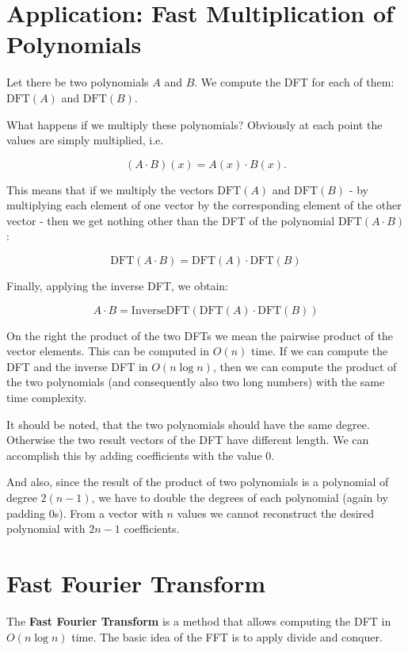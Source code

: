 \documentclass[12pt]{article}
\theoremstyle{definition}
\begin{document}
\section{Application: Fast Multiplication of Polynomials}

Let there be two polynomials $A$ and $B$.
We compute the DFT for each of them: $\text{DFT}(A)$ and $\text{DFT}(B)$.

What happens if we multiply these polynomials? Obviously at each point the values are simply multiplied, i.e.

$$(A \cdot B)(x) = A(x) \cdot B(x).$$

This means that if we multiply the vectors $\text{DFT}(A)$ and $\text{DFT}(B)$ - by multiplying each element of one vector by the corresponding element of the other vector - then we get nothing other than the DFT of the polynomial $\text{DFT}(A \cdot B)$:

$$\text{DFT}(A \cdot B) = \text{DFT}(A) \cdot \text{DFT}(B)$$

Finally, applying the inverse DFT, we obtain:

$$A \cdot B = \text{InverseDFT}(\text{DFT}(A) \cdot \text{DFT}(B))$$

On the right the product of the two DFTs we mean the pairwise product of the vector elements.
This can be computed in $O(n)$ time.
If we can compute the DFT and the inverse DFT in $O(n \log n)$, then we can compute the product of the two polynomials (and consequently also two long numbers) with the same time complexity.

It should be noted, that the two polynomials should have the same degree.
Otherwise the two result vectors of the DFT have different length.
We can accomplish this by adding coefficients with the value $0$.

And also, since the result of the product of two polynomials is a polynomial of degree $2 (n - 1)$, we have to double the degrees of each polynomial (again by padding $0$s).
From a vector with $n$ values we cannot reconstruct the desired polynomial with $2n - 1$ coefficients.


\section{Fast Fourier Transform}

The \textbf{Fast Fourier Transform} is a method that allows computing the DFT in $O(n \log n)$ time. The basic idea of the FFT is to apply divide and conquer.
\end{document}
